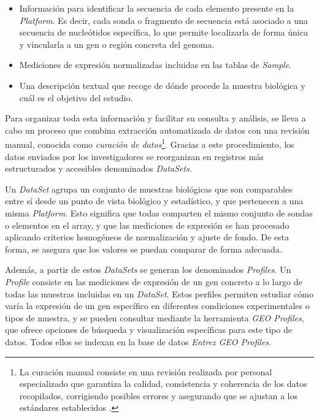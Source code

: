 \begin{itemize}
\item Información para identificar la secuencia de cada elemento presente en la \textit{Platform}. Es decir, cada sonda o fragmento de secuencia está asociado a 
una secuencia de nucleótidos específica, lo que permite localizarla de forma única y vincularla a un gen o región concreta del genoma.
\item Mediciones de expresión normalizadas incluidas en las tablas de \textit{Sample}.
\item Una descripción textual que recoge de dónde procede la muestra biológica y cuál es el objetivo del estudio.
\end{itemize}

Para organizar toda esta información y facilitar su consulta y análisis, se lleva a cabo un proceso que combina extracción automatizada de datos con una revisión 
manual, conocida como \textit{curación de datos}\footnote{La curación manual consiste en una revisión realizada por personal especializado que garantiza la calidad, 
consistencia y coherencia de los datos recopilados, corrigiendo posibles errores y asegurando que se ajustan a los estándares establecidos \cite{curacion-datos}.}. Gracias a este procedimiento, 
los datos enviados por los investigadores se reorganizan en registros más estructurados y accesibles denominados \textit{DataSets}. \newline

Un \textit{DataSet} agrupa un conjunto de muestras biológicas que son comparables entre sí desde un punto de vista biológico y estadístico, y que pertenecen a una 
misma \textit{Platform}. Esto significa que todas comparten el mismo conjunto de sondas o elementos en el array, y que las mediciones de expresión se han procesado 
aplicando criterios homogéneos de normalización y ajuste de fondo. De esta forma, se asegura que los valores se puedan comparar de forma adecuada. \newline

Además, a partir de estos \textit{DataSets} se generan los denominados \textit{Profiles}. Un \textit{Profile} consiste en las mediciones de expresión de un gen concreto 
a lo largo de todas las muestras incluidas en un \textit{DataSet}. Estos perfiles permiten estudiar cómo varía la expresión de un gen específico en diferentes condiciones 
experimentales o tipos de muestra, y se pueden consultar mediante la herramienta \textit{GEO Profiles}, que ofrece opciones de búsqueda y visualización específicas para 
este tipo de datos. Todos ellos se indexan en la base de datos \textit{Entrez GEO Profiles}. \newline

